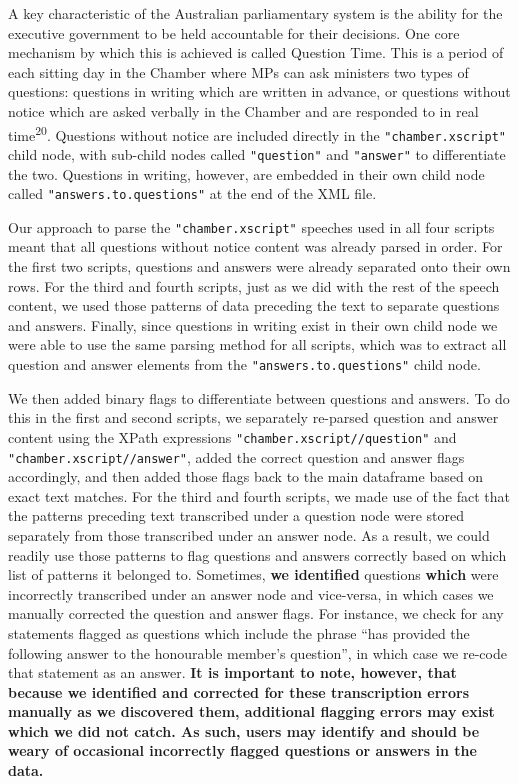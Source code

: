 \documentclass[
  letterpaper,
  DIV=11,
  numbers=noendperiod]{scrartcl}
\begin{document}
A key characteristic of the Australian parliamentary system is the
ability for the executive government to be held accountable for their
decisions. One core mechanism by which this is achieved is called
Question Time. This is a period of each sitting day in the Chamber where
MPs can ask ministers two types of questions: questions in writing which
are written in advance, or questions without notice which are asked
verbally in the Chamber and are responded to in real
time\textsuperscript{20}. Questions without notice are included directly
in the \texttt{"chamber.xscript"} child node, with sub-child nodes
called \texttt{"question"} and \texttt{"answer"} to differentiate the
two. Questions in writing, however, are embedded in their own child node
called \texttt{"answers.to.questions"} at the end of the XML file.

Our approach to parse the \texttt{"chamber.xscript"} speeches used in
all four scripts meant that all questions without notice content was
already parsed in order. For the first two scripts, questions and
answers were already separated onto their own rows. For the third and
fourth scripts, just as we did with the rest of the speech content, we
used those patterns of data preceding the text to separate questions and
answers. Finally, since questions in writing exist in their own child
node we were able to use the same parsing method for all scripts, which
was to extract all question and answer elements from the
\texttt{"answers.to.questions"} child node.

We then added binary flags to differentiate between questions and
answers. To do this in the first and second scripts, we separately
re-parsed question and answer content using the XPath expressions
\texttt{"chamber.xscript//question"} and
\texttt{"chamber.xscript//answer"}, added the correct question and
answer flags accordingly, and then added those flags back to the main
dataframe based on exact text matches. For the third and fourth scripts,
we made use of the fact that the patterns preceding text transcribed
under a question node were stored separately from those transcribed
under an answer node. As a result, we could readily use those patterns
to flag questions and answers correctly based on which list of patterns
it belonged to. Sometimes, \textbf{we identified} questions
\textbf{which} were incorrectly transcribed under an answer node and
vice-versa, in which cases we manually corrected the question and answer
flags. For instance, we check for any statements flagged as questions
which include the phrase ``has provided the following answer to the
honourable member's question'', in which case we re-code that statement
as an answer. \textbf{It is important to note, however, that because we
identified and corrected for these transcription errors manually as we
discovered them, additional flagging errors may exist which we did not
catch. As such, users may identify and should be weary of occasional
incorrectly flagged questions or answers in the data.}
\end{document}
